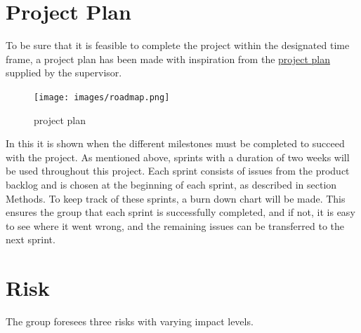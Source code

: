 \section{Project Plan}
To be sure that it is feasible to complete the project within the designated
time frame, a project plan has been made with inspiration from the
\href{https://docs.google.com/spreadsheets/d/1mZXxgDiwWwWpSyaQmMcafTjvXa2lQriszwTyt-Pf5BA/edit#gid=0}{project plan} supplied by the supervisor.

\begin{figure}[ht]
\centering 
\texttt{[image: images/roadmap.png]}
\label{figure:Project_plan}
\caption{project plan} 
\end{figure}

In this it is shown when the different milestones must be completed to succeed
with the project. As mentioned above, sprints with a duration of two weeks will
be used throughout this project. Each sprint consists of issues from the product
backlog and is chosen at the beginning of each sprint, as described in section
Methods. To keep track of these sprints, a burn down chart will be made. This 
ensures the group that each sprint is successfully completed, and if not, it is 
easy to see where it went wrong, and the remaining issues can be transferred to
the next sprint.

\section{Risk}
The group foresees three risks with varying impact levels.

